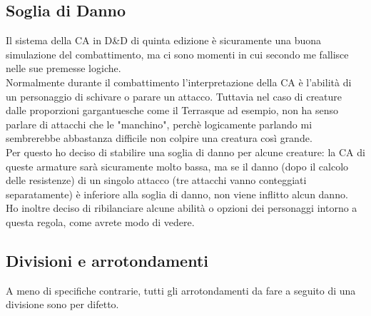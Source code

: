 \subsection{Soglia di Danno}
Il sistema della CA in D\&D di quinta edizione è sicuramente una buona simulazione del combattimento, ma ci sono momenti in cui secondo me fallisce nelle sue premesse logiche. \\ Normalmente durante il combattimento l'interpretazione della CA è l'abilità di un personaggio di schivare o parare un attacco. Tuttavia nel caso di creature dalle proporzioni gargantuesche come il Terrasque ad esempio, non ha senso parlare di attacchi che le "manchino", perchè logicamente parlando mi sembrerebbe abbastanza difficile non colpire una creatura così grande. \\ Per questo ho deciso di stabilire una soglia di danno per alcune creature: la CA di queste armature sarà sicuramente molto bassa, ma se il danno (dopo il calcolo delle resistenze) di un singolo attacco (tre attacchi vanno conteggiati separatamente) è inferiore alla soglia di danno, non viene inflitto alcun danno. \\ Ho inoltre deciso di ribilanciare alcune abilità o opzioni dei personaggi intorno a questa regola, come avrete modo di vedere. 

\subsection{Divisioni e arrotondamenti}
A meno di specifiche contrarie, tutti gli arrotondamenti da fare a seguito di una divisione sono per difetto.